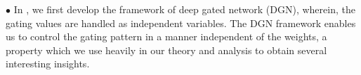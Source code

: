 \documentclass{article}
\begin{document}
\begin{comment}
\textbf{Organisation and Contributions:}\\
\begin{comment}
$\bullet$ \textbf{A study in paths:}  The first idea that is central to the analysis in this paper is that, we regard \emph{paths} to be the basic building blocks of DNNs. A path $p$, starts from an input node $i\in[d_{in}]$, passes through exactly one weight and one activation in each layer, and finally ends at the output node. For an FC-DNN with $d$ layers (depth), and $w$ hidden units per-layer, the total number of paths (denoted by $P$) starting from a given input node $i\in[d_{in}]$ is $w^{(d-1)}$. At time $t$, for an input $x\in \R^{d_{in}}$, a path $p$ is associated with two quantities namely: (i) the path value denoted by $v_t(p)$, which is the product of the weights in the path, and (ii) the path activation level denoted by $A_t(x,p)$ which is the product of the gates\footnote{In the case of DNN with ReLU activations/gates, $A_t(x,p) \in \{0,1\}$.} in the path. Note that the activation level of a path is dependent on the input and the value of a path is not dependent on the input.
\end{comment}
$\bullet$ In , we first develop the framework of deep gated network (DGN), wherein, the gating values are handled as independent variables. The DGN framework enables us to control the gating pattern in a manner independent of the weights, a property which we use heavily in our theory and analysis to obtain several interesting insights. 
\end{document}
